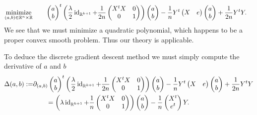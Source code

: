 \begin{align*}
	\operatorname*{\mathrm{minimize}}_{(a,b)\in \mathbb{R}^n\times\mathbb{R}}
	\quad &\quad
	\begin{pmatrix}
		a \\ b
	\end{pmatrix}^t
	\left(
	\frac{\lambda}{2}
	\operatorname{\mathrm{id}}_{\mathbb{R}^{k+1}}
	+
	\frac{1}{2n}
	\begin{pmatrix}
		X^t X & 0\\
		0 & 1
	\end{pmatrix}
	\right)
	\begin{pmatrix}
		a \\ b
	\end{pmatrix}
	-\frac{1}{n}
		Y^t
	\begin{pmatrix}
		X & e
	\end{pmatrix}
	\begin{pmatrix}
		a \\ b
	\end{pmatrix}
	+\frac{1}{2n}Y^tY.
\end{align*}
We see that we must minimize a quadratic polynomial, which happens
to be a proper convex smooth problem. Thus our theory is applicable.\smallskip

To deduce the discrete gradient descent method
we must simply compute the derivative of $ a $
and $ b $
\begin{align*}
	\Delta(a,b):=&\partial_{(a,b)}
	\begin{pmatrix}
		a \\ b
	\end{pmatrix}^t
	\left(
	\frac{\lambda}{2}
	\operatorname{\mathrm{id}}_{\mathbb{R}^{k+1}}
	+
	\frac{1}{2n}
	\begin{pmatrix}
		X^t X & 0\\
		0 & 1
	\end{pmatrix}
	\right)
	\begin{pmatrix}
		a \\ b
	\end{pmatrix}
	-\frac{1}{n}
		Y^t
	\begin{pmatrix}
		X & e
	\end{pmatrix}
	\begin{pmatrix}
		a \\ b
	\end{pmatrix}
	+\frac{1}{2n}Y^tY\\
	&\qquad=\left(
	\lambda\operatorname{\mathrm{id}}_{\mathbb{R}^{k+1}}
	+
	\frac{1}{n}
	\begin{pmatrix}
		X^t X & 0\\
		0 & 1
	\end{pmatrix}
	\right)
	\begin{pmatrix}
		a \\ b
	\end{pmatrix}
	-\frac{1}{n}
	\begin{pmatrix}
		X^t \\ e^t
	\end{pmatrix}
	Y.
\end{align*}

